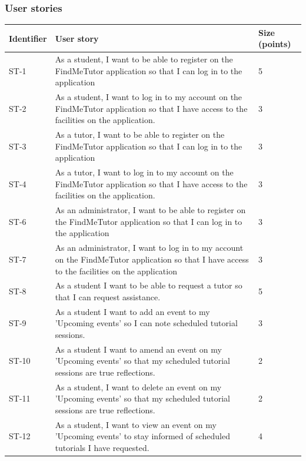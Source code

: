 \documentclass[12pt]{article}
\begin{document}
\newpage
\subsubsection{User stories}
{

\begin{longtable}{| l | p{10cm}| l |}
			\hline
			\textbf{Identifier} & \textbf{User story} & \textbf{Size (points)}

						\\ \hline ST-1 & As a student, I want to be able to register on the FindMeTutor application so that I can log in to the application  & 5
			\\ \hline ST-2 & As a student, I want to  log in to my account on the FindMeTutor application so that I have access to the facilities on the application.  & 3
			\\ \hline ST-3 & As a tutor, I want to be able to register on the FindMeTutor application so that I can log in to the application  & 3
																\\ \hline ST-4 & As a tutor, I want to  log in to my account on the FindMeTutor application so that I have access to the facilities on the application.  & 3
																\\ \hline ST-6 & As an administrator, I want to be able to register on the FindMeTutor application so that I can log in to the application  & 3
													\\ \hline ST-7 & As an administrator, I want to  log in to my account on the FindMeTutor application so that I have access to the facilities on the application  &3

			\\ \hline ST-8 & As a student I want to be able to request a tutor so that I can request assistance.& 5
			\\ \hline ST-9 & As a student I want to add an event to my 'Upcoming events' so I can note scheduled tutorial sessions. &3

			\\ \hline ST-10 & As a student I want to amend an event on my 'Upcoming events' so that my scheduled tutorial sessions are true reflections. & 2

			\\ \hline ST-11 & As a student, I want to delete an event on my 'Upcoming events' so that my scheduled tutorial sessions are true reflections. & 2

			\\ \hline ST-12 & As a student, I want to  view an event on my 'Upcoming events' to stay informed of scheduled tutorials I have requested. & 4


\end{longtable}}
\end{document}
